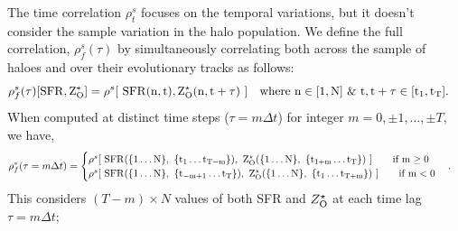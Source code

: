 The time correlation $\rho^s_t$ focuses on the temporal variations, but it doesn't consider the sample variation in the halo population. We define the full correlation, $\rho^s_f(\tau)$ by simultaneously correlating both across the sample of haloes and over their evolutionary tracks as follows:
\begin{align}
\rho^s_f (\tau)[\rm{SFR}, Z^{\star}_{\rm{O}}] &= \rho^s [ ~\rm{SFR}(n,t), Z^{\star}_{\rm{O}}(n,t+\tau) ~] \quad \text{where } n \in [1,N] ~\&~ t, t+\tau \in [t_1,t_T].
\end{align}
When computed at distinct time steps ($\tau = m \Delta t$) for integer $m=0, \pm1, \ldots, \pm T$, we have,
\begin{align}
\label{eq:def-full-corr}
\rho^s_f (\tau = m \Delta t) &= 
\begin{cases}
\rho^s [ ~\rm{SFR}(\{1 \ldots N\}, ~\{t_1 \ldots t_{T-m}\}), ~Z^{\star}_{\rm{O}}(\{1 \ldots N\}, ~\{t_{1+m} \ldots t_T\}) ~]  \qquad \text{if } m \geq 0 \\
\rho^s [ ~\rm{SFR}(\{1 \ldots N\}, ~\{t_{-m+1} \ldots t_T\}), ~Z^{\star}_{\rm{O}}(\{1 \ldots N\}, ~\{t_1 \ldots t_{T+m}\}) ~] \qquad \text{if } m < 0
\end{cases}.
\end{align}
This considers $(T-m) \times N$ values of both SFR and $Z^{\star}_{\rm{O}}$ at each time lag $\tau = m \Delta t$; 
